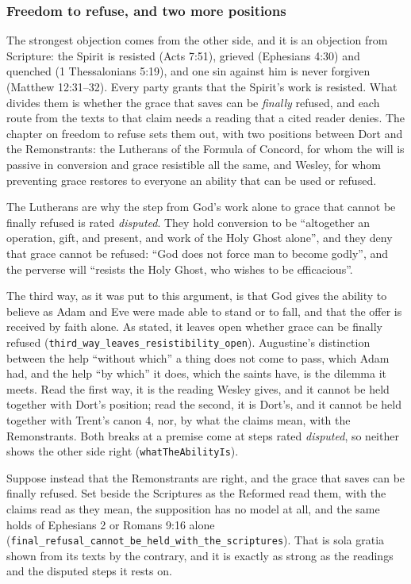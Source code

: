 \documentclass[11pt]{article}
\begin{document}
\subsubsection*{Freedom to refuse, and two more positions}
The strongest objection comes from the other side, and it is an objection from Scripture: the Spirit is resisted (Acts 7:51), grieved (Ephesians 4:30) and quenched (1 Thessalonians 5:19), and one sin against him is never forgiven (Matthew 12:31–32). Every party grants that the Spirit’s work is resisted. What divides them is whether the grace that saves can be \emph{finally} refused, and each route from the texts to that claim needs a reading that a cited reader denies. The chapter on freedom to refuse sets them out, with two positions between Dort and the Remonstrants: the Lutherans of the Formula of Concord, for whom the will is passive in conversion and grace resistible all the same, and Wesley, for whom preventing grace restores to everyone an ability that can be used or refused.

The Lutherans are why the step from God’s work alone to grace that cannot be finally refused is rated \emph{disputed}. They hold conversion to be “altogether an operation, gift, and present, and work of the Holy Ghost alone”, and they deny that grace cannot be refused: “God does not force man to become godly”, and the perverse will “resists the Holy Ghost, who wishes to be efficacious”.

The third way, as it was put to this argument, is that God gives the ability to believe as Adam and Eve were made able to stand or to fall, and that the offer is received by faith alone. As stated, it leaves open whether grace can be finally refused (\texttt{third\_\allowbreak{}way\_\allowbreak{}leaves\_\allowbreak{}resistibility\_\allowbreak{}open}). Augustine’s distinction between the help “without which” a thing does not come to pass, which Adam had, and the help “by which” it does, which the saints have, is the dilemma it meets. Read the first way, it is the reading Wesley gives, and it cannot be held together with Dort’s position; read the second, it is Dort’s, and it cannot be held together with Trent’s canon 4, nor, by what the claims mean, with the Remonstrants. Both breaks at a premise come at steps rated \emph{disputed}, so neither shows the other side right (\texttt{what\allowbreak{}The\allowbreak{}Ability\allowbreak{}Is}).

Suppose instead that the Remonstrants are right, and the grace that saves can be finally refused. Set beside the Scriptures as the Reformed read them, with the claims read as they mean, the supposition has no model at all, and the same holds of Ephesians 2 or Romans 9:16 alone (\texttt{final\_\allowbreak{}refusal\_\allowbreak{}cannot\_\allowbreak{}be\_\allowbreak{}held\_\allowbreak{}with\_\allowbreak{}the\_\allowbreak{}scriptures}). That is sola gratia shown from its texts by the contrary, and it is exactly as strong as the readings and the disputed steps it rests on.
\end{document}
